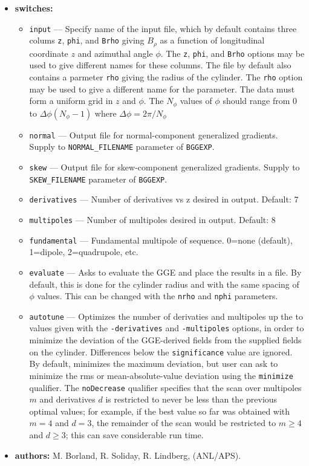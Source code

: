 \documentclass[11pt]{article}
\begin{document}
\begin{itemize}
\item {\bf switches:}
\begin{itemize}
\item {\tt input} --- Specify name of the input file, which by default contains three colums \verb|z|, \verb|phi|, and
  \verb|Brho| giving $B_\rho$ as a function of longitudinal coordinate $z$ and azimuthal angle $\phi$.  The \verb|z|,
  \verb|phi|, and \verb|Brho| options may be used to give different names for these columns.  The file by default also
  contains a parmeter \verb|rho| giving the radius of the cylinder. The \verb|rho| option may be used to give a
  different name for the parameter.  The data must form a uniform grid in $z$ and $\phi$. The $N_\phi$ values of $\phi$
  should range from $0$ to $\Delta \phi (N_\phi-1)$ where $\Delta \phi = 2\pi/N_\phi$
\item {\tt normal} ---  Output file for normal-component generalized gradients. Supply to \verb|NORMAL_FILENAME|
  parameter of \verb|BGGEXP|.
\item {\tt skew} ---  Output file for skew-component generalized gradients. Supply to \verb|SKEW_FILENAME|
  parameter of \verb|BGGEXP|.
\item {\tt derivatives} --- Number of derivatives vs z desired in output. Default: 7
\item {\tt multipoles} ---  Number of multipoles desired in output. Default: 8
\item {\tt fundamental} --- Fundamental multipole of sequence. 0=none (default), 1=dipole, 2=quadrupole, etc.
\item {\tt evaluate} --- Asks to evaluate the GGE and place the results in a file. By default, this is done
  for the cylinder radius and with the same spacing of $\phi$ values. This can be changed with the \verb|nrho|
  and \verb|nphi| parameters.
\item {\tt autotune} --- Optimizes the number of derivaties and multipoles up the to values given with the
  \verb|-derivatives| and \verb|-multipoles| options, in order to minimize the deviation of the GGE-derived
  fields from the supplied fields on the cylinder. Differences below the \verb|significance| value are
  ignored. By default, minimizes the maximum deviation, but user can
  ask to minimize the rms or mean-absolute-value deviation using the \verb|minimize| qualifier.
  The \verb|noDecrease| qualifier specifies that the scan over multipoles $m$ and derivatives $d$
  is restricted to never be less than the previous optimal values; for example, if the best value
  so far was obtained with $m=4$ and $d=3$, the remainder of the scan would be restricted to $m\ge 4$ and $d\ge 3$;
  this can save considerable run time.
\end{itemize}

\item {\bf authors:} M. Borland, R. Soliday, R. Lindberg, (ANL/APS).
\end{itemize}
\end{document}

